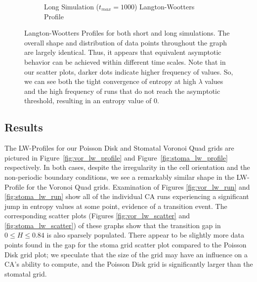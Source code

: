 \documentclass[a4paper,11pt]{report}
\begin{document}
\begin{figure}[htp]
\begin{subfigure}[t]{0.6\textwidth}
  \caption{Long Simulation ($t_{max} = 1000$) Langton-Wootters Profile}
  \label{fig:lw_profile_long}
  \end{subfigure}
\caption[Langton-Wootters Profile for Short and Long Simulations]{
  Langton-Wootters Profiles for both short and long simulations. The overall shape and distribution of data points throughout the graph are largely identical. Thus, it appears that equivalent asymptotic behavior can be achieved within different time scales. Note that in our scatter plots, darker dots indicate higher frequency of values. So, we can see both the tight convergence of entropy at high $\lambda$ values and the high frequency of runs that do not reach the asymptotic threshold, resulting in an entropy value of 0.
}
\label{fig:lw_reg_short_long}
\end{figure}

\subsection*{Results}

The LW-Profiles for our Poisson Disk and Stomatal Voronoi Quad grids are pictured in Figure~\ref{fig:vor_lw_profile} and Figure~\ref{fig:stoma_lw_profile} respectively. In both cases, despite the irregularity in the cell orientation and the non-periodic boundary conditions, we see a remarkably similar shape in the LW-Profile for the Voronoi Quad grids. Examination of Figures \ref{fig:vor_lw_run} and \ref{fig:stoma_lw_run} show all of the individual CA runs experiencing a significant jump in entropy values at some point, evidence of a transition event. The corresponding scatter plots (Figures \ref{fig:vor_lw_scatter} and \ref{fig:stoma_lw_scatter}) of these graphs show that the transition gap in $0 \le H \le 0.84$ is also sparsely populated. There appear to be slightly more data points found in the gap for the stoma grid scatter plot compared to the Poisson Disk grid plot; we speculate that the size of the grid may have an influence on a CA's ability to compute, and the Poisson Disk grid is significantly larger than the stomatal grid. 
\end{document}
